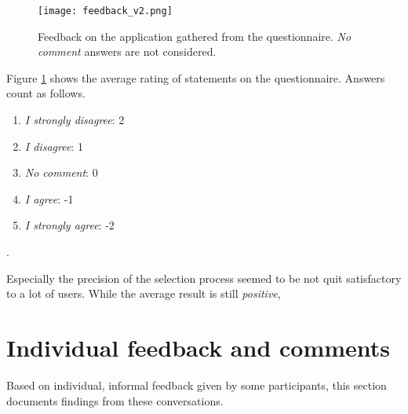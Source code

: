 \begin{figure}[h]
	\centering
	\texttt{[image: feedback\_v2.png]}\\ %
	\caption{Feedback on the application gathered from the questionnaire. \textit{No comment} answers are not considered.}
	\label{fig:feedback_questionnaire}
\end{figure}

Figure \ref{fig:feedback_questionnaire} shows the average rating of statements on the questionnaire. Answers count as follows.

\begin{enumerate}
	\item \textit{I strongly disagree}: 2
	\item \textit{I disagree}: 1
	\item \textit{No comment}: 0
	\item \textit{I agree}: -1
	\item \textit{I strongly agree}: -2
\end{enumerate}.

Especially the precision of the selection process seemed to be not quit satisfactory to a lot of users. While the average result is still \textit{positive}, 

	\section{Individual feedback and comments}
	\label{sec:individual_feedback_and_comments}
Based on individual, informal feedback given by some participants, this section documents findings from these conversations.

